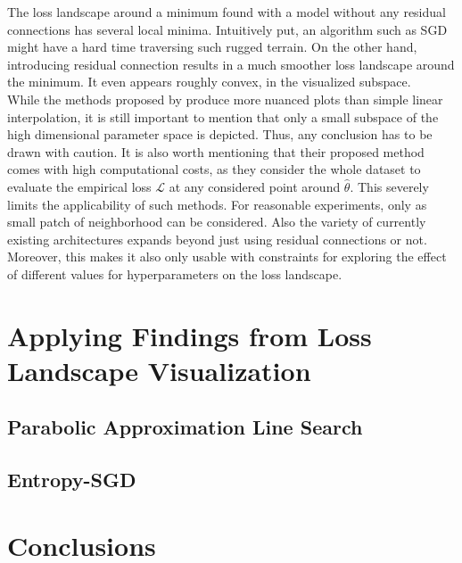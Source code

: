 \documentclass[a4paper]{scrartcl}
\begin{document}
The loss landscape around a minimum found with a model without any residual connections has several local minima. Intuitively put, an algorithm such as SGD might have a hard time traversing such rugged terrain. On the other hand, introducing residual connection results in a much smoother loss landscape around the minimum. It even appears roughly convex, in the visualized subspace.\\
While the methods proposed by \cite{li2017visualizing} produce more nuanced plots than simple linear interpolation, it is still important to mention that only a small subspace of the high dimensional parameter space is depicted. Thus, any conclusion has to be drawn with caution. It is also worth mentioning that their proposed method comes with high computational costs, as they consider the whole dataset to evaluate the empirical loss $\mathcal{L}$ at any considered point around $\hat{\theta}$. This 
severely limits the applicability of such methods. For reasonable experiments, only as small patch of neighborhood can be considered. Also the variety of currently existing architectures expands beyond just using residual connections or not. Moreover, this makes it also only usable with constraints for exploring the effect of different values for hyperparameters on the loss landscape.









\section*{Applying Findings from Loss Landscape Visualization}
\subsection*{Parabolic Approximation Line Search}
\subsection*{Entropy-SGD}


\section*{Conclusions}




	
\end{document}
